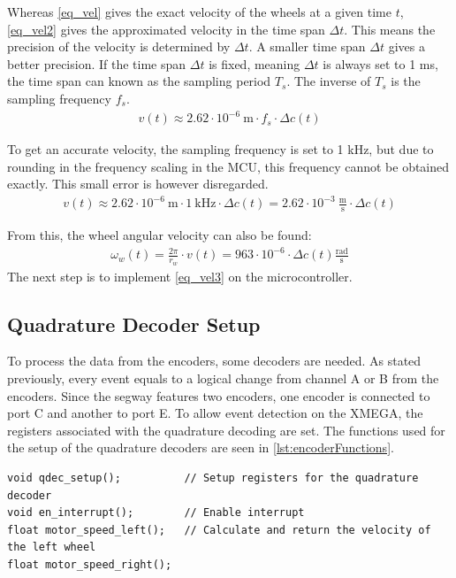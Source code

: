 Whereas \autoref{eq_vel} gives the exact velocity of the wheels at a given time $t$, \autoref{eq_vel2} gives the approximated velocity in the time span $\Delta t$. This means the precision of the velocity is determined by $\Delta t$. A smaller time span $\Delta t$ gives a better precision.
If the time span $\Delta t$ is fixed, meaning $\Delta t$ is always set to 1 ms, the time span can known as the sampling period $T_{s}$. The inverse of $T_{s}$ is the sampling frequency $f_{s}$.
\begin{align}
v(t) \approx 2.62 \cdot 10^{-6} \: \text{m} \cdot f_s \cdot \Delta c(t) 
\end{align}

To get an accurate velocity, the sampling frequency is set to 1 kHz, but due to rounding in the frequency scaling in the MCU, this frequency cannot be obtained exactly. This small error is however disregarded.
\begin{align}
v(t) \approx 2.62 \cdot 10^{-6} \: \text{m} \cdot 1 \: \text{kHz} \cdot \Delta c(t)  = 2.62 \cdot 10^{-3} \: \frac{\text{m}}{\text{s}} \cdot \Delta c(t) 
\label{eq_vel3}
\end{align}

From this, the wheel angular velocity can also be found:
\begin{align}
\omega_w(t) = \frac{2\pi}{r_w}\cdot v(t) = 963 \cdot 10^{-6} \cdot \Delta c(t) \frac{\text{rad}}{\text{s}}
\end{align}	
The next step is to implement \autoref{eq_vel3} on the microcontroller.

\subsection{Quadrature Decoder Setup}
To process the data from the encoders, some decoders are needed. As stated previously, every event equals to a logical change from channel A or B from the encoders. Since the segway features two encoders, one encoder is connected to port C and another to port E. To allow event detection on the XMEGA, the registers associated with the quadrature decoding are set. The functions used for the setup of the quadrature decoders are seen in \autoref{lst:encoderFunctions}.

\begin{lstlisting}
void qdec_setup();			// Setup registers for the quadrature decoder
void en_interrupt();		// Enable interrupt
float motor_speed_left();	// Calculate and return the velocity of the left wheel
float motor_speed_right();
\end{lstlisting}

